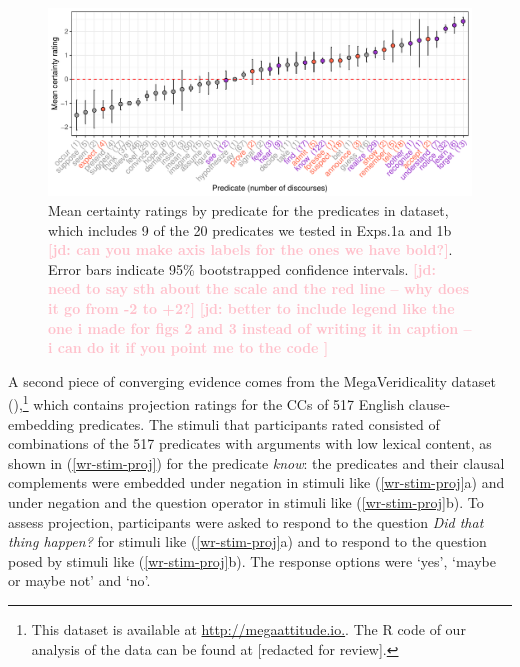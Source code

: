 \documentclass[11pt,fleqn]{article}
\newcommand{\jd}[1]{\textbf{\textcolor{Pink}{[jd: #1]}}}
\newcommand{\6}{\mbox{$[\hspace*{-.6mm}[$}}
\newcommand{\9}{\mbox{$]\hspace*{-.6mm}]$}}
\begin{document}
\begin{figure}[H]
\centering
\includegraphics[width=.75\paperwidth]{figures/3-way-means-projectivity-by-predicate-variability}

\caption{Mean certainty ratings by predicate for the predicates in \citet*{demarneffe-etal-sub23} dataset, which includes 9 of the 20 predicates we tested in Exps.1a and 1b \jd{can you make axis labels for the ones we have bold?}. Error bars indicate 95\% bootstrapped confidence intervals. \jd{need to say sth about the scale and the red line -- why does it go from -2 to +2?} \jd{better to include legend like the one i made for figs 2 and 3 instead of writing it in caption -- i can do it if you point me to the code }}%
\label{f-commitmentbank}
\end{figure}

A second piece of converging evidence comes from the MegaVeridicality dataset (\citealt{white-rawlins-nels2018,white-etal2018b}),\footnote{This dataset is  available at \url{http://megaattitude.io.}. The R code of our analysis of the data can be found at  [redacted for review].}
which contains projection ratings for the CCs of 517 English clause-embedding predicates. The stimuli that participants rated consisted of combinations of the 517 predicates with arguments with low lexical content, as shown in (\ref{wr-stim-proj}) for the predicate {\em know}: the predicates and their clausal complements were embedded under negation in stimuli like (\ref{wr-stim-proj}a) and under negation and the question operator in stimuli like (\ref{wr-stim-proj}b). To assess projection, participants were asked to respond to the question {\em Did that thing happen?} for stimuli like (\ref{wr-stim-proj}a) and to respond to the question posed by stimuli like (\ref{wr-stim-proj}b). The response options were `yes', `maybe or maybe not' and `no'. 
\end{document}
